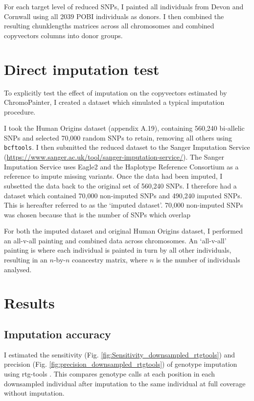 For each target level of reduced SNPs, I painted all individuals from Devon and Cornwall using all 2039 POBI individuals as donors. I then combined the resulting chunklengths matrices across all chromosomes and combined copyvectors columns into donor groups.

\section{Direct imputation test}

To explicitly test the effect of imputation on the copyvectors estimated by ChromoPainter, I created a dataset which simulated a typical imputation procedure. 

I took the Human Origins dataset (appendix A.19), containing 560,240 bi-allelic SNPs and selected 70,000 random SNPs to retain, removing all others using \texttt{bcftools}. I then submitted the reduced dataset to the Sanger Imputation Service (\url{https://www.sanger.ac.uk/tool/sanger-imputation-service/}). The Sanger Imputation Service uses Eagle2 \cite{loh2016reference} and the Haplotype Reference Consortium as a reference to impute missing variants. Once the data had been imputed, I subsetted the data back to the original set of 560,240 SNPs. I therefore had a dataset which contained 70,000 non-imputed SNPs and 490,240 imputed SNPs. This is hereafter referred to as the `imputed dataset'. 70,000 non-imputed SNPs was chosen because that is the number of SNPs which overlap

For both the imputed dataset and original Human Origins dataset, I performed an all-v-all painting and combined data across chromosomes. An `all-v-all' painting is where each individual is painted in turn by all other individuals, resulting in an $n$-by-$n$ coancestry matrix, where $n$ is the number of individuals analysed. 


\section{Results}

\subsection{Imputation accuracy}

I estimated the sensitivity (Fig. \ref{fig:Sensitivity_downsampled_rtgtools}) and precision (Fig.  \ref{fig:precision_downsampled_rtgtools}) of genotype imputation using rtg-tools \cite{cleary2014joint}. This compares genotype calls at each position in each downsampled individual after imputation to the same individual at full coverage without imputation.

